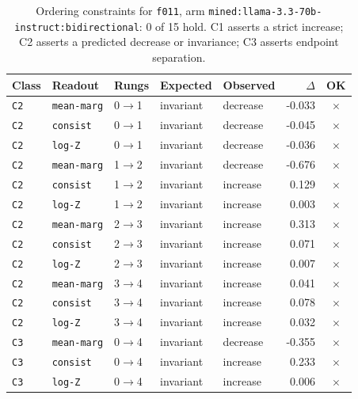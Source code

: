 \documentclass[11pt]{article}
\begin{document}
\begin{table}[htbp]
\centering
\small
\caption{Ordering constraints for \texttt{f011}, arm \texttt{mined:llama-3.3-70b-instruct:bidirectional}: 0 of 15 hold. C1 asserts a strict increase; C2 asserts a predicted decrease or invariance; C3 asserts endpoint separation.}
\label{tab:ladder-f011-mined-llama-3-3-70b-instruct-bidirectional}
\begin{tabular}{lllllrc}
\toprule
Class & Readout & Rungs & Expected & Observed & $\Delta$ & OK \\
\midrule
\texttt{C2} & \texttt{mean-marg} & 0$\to$1 & invariant & decrease & -0.033 & $\times$ \\
\texttt{C2} & \texttt{consist} & 0$\to$1 & invariant & decrease & -0.045 & $\times$ \\
\texttt{C2} & \texttt{log-Z} & 0$\to$1 & invariant & decrease & -0.036 & $\times$ \\
\texttt{C2} & \texttt{mean-marg} & 1$\to$2 & invariant & decrease & -0.676 & $\times$ \\
\texttt{C2} & \texttt{consist} & 1$\to$2 & invariant & increase & 0.129 & $\times$ \\
\texttt{C2} & \texttt{log-Z} & 1$\to$2 & invariant & increase & 0.003 & $\times$ \\
\texttt{C2} & \texttt{mean-marg} & 2$\to$3 & invariant & increase & 0.313 & $\times$ \\
\texttt{C2} & \texttt{consist} & 2$\to$3 & invariant & increase & 0.071 & $\times$ \\
\texttt{C2} & \texttt{log-Z} & 2$\to$3 & invariant & increase & 0.007 & $\times$ \\
\texttt{C2} & \texttt{mean-marg} & 3$\to$4 & invariant & increase & 0.041 & $\times$ \\
\texttt{C2} & \texttt{consist} & 3$\to$4 & invariant & increase & 0.078 & $\times$ \\
\texttt{C2} & \texttt{log-Z} & 3$\to$4 & invariant & increase & 0.032 & $\times$ \\
\texttt{C3} & \texttt{mean-marg} & 0$\to$4 & invariant & decrease & -0.355 & $\times$ \\
\texttt{C3} & \texttt{consist} & 0$\to$4 & invariant & increase & 0.233 & $\times$ \\
\texttt{C3} & \texttt{log-Z} & 0$\to$4 & invariant & increase & 0.006 & $\times$ \\
\bottomrule
\end{tabular}
\end{table}
\end{document}
